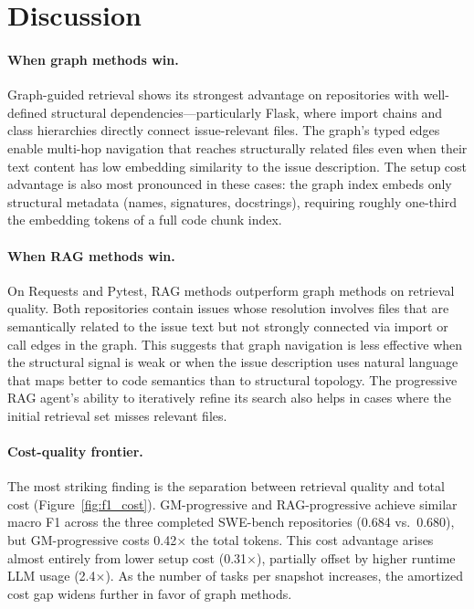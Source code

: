 \section{Discussion}
\label{sec:discussion}

\paragraph{When graph methods win.}
Graph-guided retrieval shows its strongest advantage on repositories with well-defined structural dependencies---particularly Flask, where import chains and class hierarchies directly connect issue-relevant files. The graph's typed edges enable multi-hop navigation that reaches structurally related files even when their text content has low embedding similarity to the issue description. The setup cost advantage is also most pronounced in these cases: the graph index embeds only structural metadata (names, signatures, docstrings), requiring roughly one-third the embedding tokens of a full code chunk index.

\paragraph{When RAG methods win.}
On Requests and Pytest, RAG methods outperform graph methods on retrieval quality. Both repositories contain issues whose resolution involves files that are semantically related to the issue text but not strongly connected via import or call edges in the graph. This suggests that graph navigation is less effective when the structural signal is weak or when the issue description uses natural language that maps better to code semantics than to structural topology. The progressive RAG agent's ability to iteratively refine its search also helps in cases where the initial retrieval set misses relevant files.

\paragraph{Cost-quality frontier.}
The most striking finding is the separation between retrieval quality and total cost (Figure~\ref{fig:f1_cost}). GM-progressive and RAG-progressive achieve similar macro F1 across the three completed SWE-bench repositories (0.684 vs.\ 0.680), but GM-progressive costs 0.42$\times$ the total tokens. This cost advantage arises almost entirely from lower setup cost (0.31$\times$), partially offset by higher runtime LLM usage (2.4$\times$). As the number of tasks per snapshot increases, the amortized cost gap widens further in favor of graph methods.

